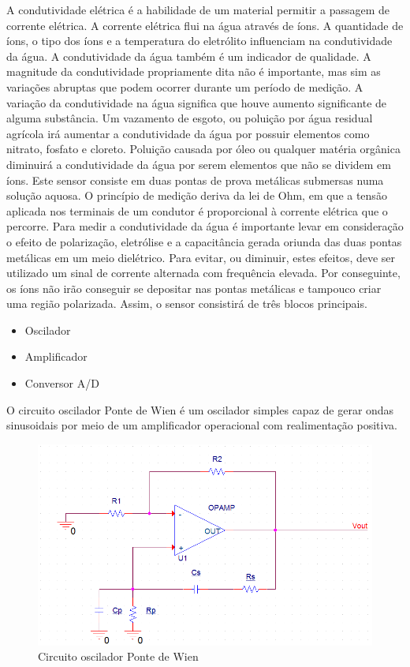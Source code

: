A condutividade elétrica é a habilidade de um material permitir a passagem de corrente elétrica. A corrente elétrica flui na água através de íons. A quantidade de íons, o tipo dos íons e a temperatura do eletrólito influenciam na condutividade da água.
A condutividade da água também é um indicador de qualidade. A magnitude da condutividade propriamente dita não é importante, mas sim as variações abruptas que podem ocorrer durante um período de medição. A variação da condutividade na água significa que houve aumento significante de alguma substância. Um vazamento de esgoto, ou poluição por água residual agrícola irá aumentar a condutividade da água por possuir elementos como nitrato, fosfato e cloreto. Poluição causada por óleo ou qualquer matéria orgânica diminuirá a condutividade da água por serem elementos que não se dividem em íons.
Este sensor consiste em duas pontas de prova metálicas submersas numa solução aquosa. O princípio de medição deriva da lei de Ohm, em que a tensão aplicada nos terminais de um condutor é proporcional à corrente elétrica que o percorre. Para medir a condutividade da água é importante levar em consideração o efeito de polarização, eletrólise e a capacitância gerada oriunda das duas pontas metálicas em um meio dielétrico. Para evitar, ou diminuir, estes efeitos, deve ser utilizado um sinal de corrente alternada com frequência elevada. Por conseguinte, os íons não irão conseguir se depositar nas pontas metálicas e tampouco criar uma região polarizada. Assim, o sensor consistirá de três blocos principais. 

\begin{itemize}
	\item Oscilador
	\item Amplificador
	\item Conversor A/D
\end{itemize}

O circuito oscilador Ponte de Wien é um oscilador simples capaz de gerar ondas sinusoidais por meio de um amplificador operacional com realimentação positiva.

\FloatBarrier
 \begin{figure} [!htp]
	\centering
	\includegraphics[scale=0.6]{figuras/pontewien}
	\caption{Circuito oscilador Ponte de Wien}
	\label{pontewien}
\end{figure}
\FloatBarrier

